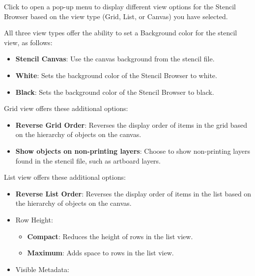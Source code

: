 \documentclass[../main.tex]{subfiles}
\begin{document}
\begin{description}[style=nextline]
  \item[{\ogicon{12.5pt}{res/og7_button_stencils_viewoptions.png}}] Click to open a pop-up menu
    to display different view options for the Stencil Browser based on the view type (Grid,
    List, or Canvas) you have selected.


    All three view types offer the ability to set a Background color for the stencil view, as
    follows:

    \begin{itemize}
      \item \textbf{Stencil Canvas}: Use the canvas background from the stencil file.
      \item \textbf{White}: Sets the background color of the Stencil Browser to white.
      \item \textbf{Black}: Sets the background color of the Stencil Browser to black.
    \end{itemize}

    Grid view offers these additional options:

    \begin{itemize}
      \item \textbf{Reverse Grid Order}: Reverses the display order of items in the grid based on
        the hierarchy of objects on the canvas.
      \item \textbf{Show objects on non-printing layers}: Choose to show non-printing layers found
        in the stencil file, such as artboard layers.
    \end{itemize}

    List view offers these additional options:

    \begin{itemize}
      \item \textbf{Reverse List Order}: Reverses the display order of items in the list based on
        the hierarchy of objects on the canvas.
      \item Row Height:

        \begin{itemize}
          \item \textbf{Compact}: Reduces the height of rows in the list view.
          \item \textbf{Maximum}: Adds space to rows in the list view.
        \end{itemize}
      \item Visible Metadata:


\end{itemize}
\end{description}
\end{document}
